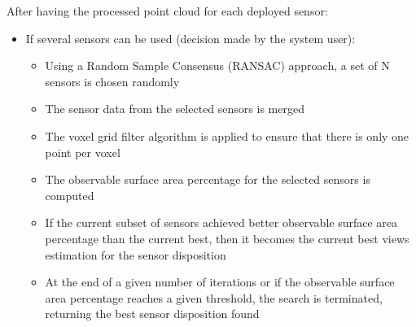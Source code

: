 After having the processed point cloud for each deployed sensor:
\begin{itemize}
	\item If several sensors can be used (decision made by the system user):
	\begin{itemize}
		\item Using a Random Sample Consensus (RANSAC) approach, a set of N sensors is chosen randomly
		\item The sensor data from the selected sensors is merged
		\item The voxel grid filter algorithm is applied to ensure that there is only one point per voxel
		\item The observable surface area percentage for the selected sensors is computed
		\item If the current subset of sensors achieved better observable surface area percentage than the current best, then it becomes the current best views estimation for the sensor disposition
		\item At the end of a given number of iterations or if the observable surface area percentage reaches a given threshold, the search is terminated, returning the best sensor disposition found
	\end{itemize}
\end{itemize}
